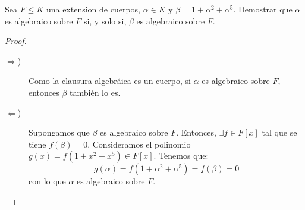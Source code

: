 \begin{ejercicio}
    Sea $F \leq K$ una extension de cuerpos, $\alpha \in K$ y $\beta = 1 + \alpha^2 +\alpha^5$. Demostrar que $\alpha$ es algebraico sobre $F$ si, y solo si, $\beta$ es algebraico sobre $F$.
    \begin{proof}\
        \begin{description}
            \item[$\Longrightarrow$)] Como la clausura algebráica es un cuerpo, si $\alpha$ es algebraico sobre $F$, entonces $\beta$ también lo es.
            \item[$\Longleftarrow$)] Supongamos que $\beta$ es algebraico sobre $F$. Entonces, $\exists f\in F[x]$ tal que se tiene $f(\beta)=0$. Consideramos el polinomio $g(x) = f(1+x^2+x^5)\in F[x]$. Tenemos que:
            \begin{equation*}
                g(\alpha) = f(1+\alpha^2+\alpha^5) = f(\beta) = 0
            \end{equation*}
            con lo que $\alpha$ es algebraico sobre $F$. \qedhere
        \end{description}
    \end{proof}
\end{ejercicio}

